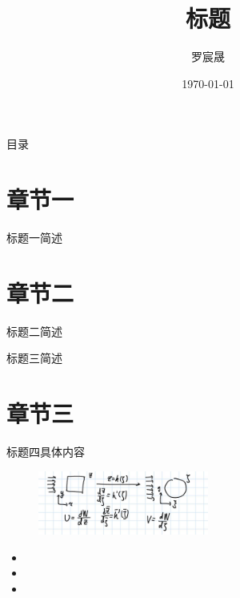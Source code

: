 \documentclass[aspectratio=169]{beamer}
\author[]{罗宸晟}
\title{标题}
\institute{北京航空航天大学中法工程师学院/国际通用工程师学院 \\ 数理实验室-复杂系统实验室}
\date{\today}
\begin{document}
\maketitle
\begin{frame}{目录}
\tableofcontents
\end{frame}
\section{章节一}
\begin{frame}[allowframebreaks]{标题一}{简述}
\zhlipsum[10]
\end{frame}

\section{章节二}
\begin{frame}[allowframebreaks]{标题二}{简述}
\zhlipsum[11]
\end{frame}
\begin{frame}[allowframebreaks]{标题三}{简述}
\zhlipsum[12]
\end{frame}

\section{章节三}

\begin{frame}[allowframebreaks]{标题四}{具体内容}
\zhlipsum[1]
\begin{figure}
    \centering
    \includegraphics[width=0.5\textwidth]{../picture/1.jpg}
\end{figure}

\zhlipsum[2]
\begin{itemize}
    \item \zhlipsum[3]
    \item \zhlipsum[4]
    \item \zhlipsum[5]
\end{itemize}
\zhlipsum[6]
\end{frame}
\end{document}
